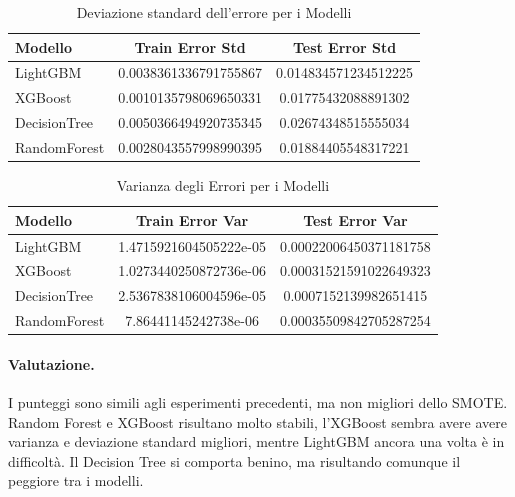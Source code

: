 \begin{table}[H]
    \centering
    \begin{tabular}{lcc}
    \toprule
    \textbf{Modello} & \textbf{Train Error Std} & \textbf{Test Error Std} \\
    \midrule
    LightGBM & 0.0038361336791755867 & 0.014834571234512225 \\
    XGBoost & 0.0010135798069650331 & 0.01775432088891302 \\
    DecisionTree & 0.0050366494920735345 & 0.02674348515555034 \\
    RandomForest & 0.0028043557998990395 & 0.01884405548317221 \\
    \bottomrule
    \end{tabular}
    \caption{Deviazione standard dell'errore per i Modelli}
    
\end{table}

\begin{table}[H]
    \centering
    \begin{tabular}{lcc}
    \toprule
    \textbf{Modello} & \textbf{Train Error Var} & \textbf{Test Error Var} \\
    \midrule
    LightGBM & 1.4715921604505222e-05 & 0.00022006450371181758 \\
    XGBoost & 1.0273440250872736e-06 & 0.00031521591022649323 \\
    DecisionTree & 2.5367838106004596e-05 & 0.0007152139982651415\\
    RandomForest & 7.86441145242738e-06 & 0.00035509842705287254 \\
    \bottomrule
    \end{tabular}
    \caption{Varianza degli Errori per i Modelli}
    
\end{table}

\paragraph{Valutazione.} I punteggi sono simili agli esperimenti precedenti, ma non migliori dello SMOTE. \\ Random Forest e XGBoost risultano molto stabili, l'XGBoost sembra avere avere varianza e deviazione standard migliori, mentre LightGBM ancora una volta è in difficoltà. Il Decision Tree si comporta benino, ma risultando comunque il peggiore tra i modelli.


